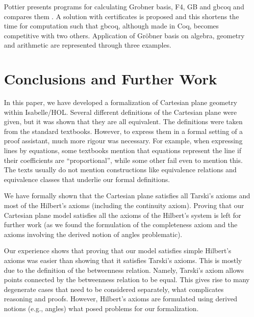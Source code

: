 Pottier presents programs for calculating Grobner basis, F4, GB and
gbcoq and compares them \cite{grobner_coq}.  A solution with
certificates is proposed and this shortens the time for computation
such that gbcoq, although made in Coq, becomes competitive with two
others. Application of Gr\"obner basis on algebra, geometry and
arithmetic are represented through three examples.



\section{Conclusions and Further Work}
\label{sec:concl}

In this paper, we have developed a formalization of Cartesian plane
geometry within Isabelle/HOL. Several different definitions of the
Cartesian plane were given, but it was shown that they are all
equivalent. The definitions were taken from the standard
textbooks. However, to express them in a formal setting of a proof
assistant, much more rigour was necessary. For example, when
expressing lines by equations, some textbooks mention that equations
represent the line if their coefficients are ``proportional'', while
some other fail even to mention this. The texts usually do not mention
constructions like equivalence relations and equivalence classes that
underlie our formal definitions.

We have formally shown that the Cartesian plane satisfies all Tarski's
axioms and most of the Hilbert's axioms (including the continuity
axiom). Proving that our Cartesian plane model satisfies all the
axioms of the Hilbert's system is left for further work (as we found
the formulation of the completeness axiom and the axioms involving the
derived notion of angles problematic).

Our experience shows that proving that our model satisfies simple
Hilbert's axioms was easier than showing that it satisfies Tarski's
axioms. This is mostly due to the definition of the betweenness
relation. Namely, Tarski's axiom allows points connected by the
betweenness relation to be equal. This gives rise to many degenerate
cases that need to be considered separately, what complicates
reasoning and proofs. However, Hilbert's axioms are formulated using
derived notions (e.g., angles) what posed problems for our
formalization.

